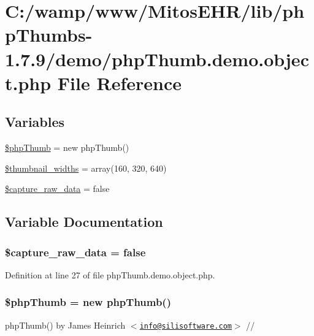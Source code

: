 \hypertarget{php_thumb_8demo_8object_8php}{\section{\-C\-:/wamp/www/\-Mitos\-E\-H\-R/lib/php\-Thumbs-\/1.7.9/demo/php\-Thumb.demo.\-object.\-php \-File \-Reference}
\label{php_thumb_8demo_8object_8php}
}
\subsection*{\-Variables}
\begin{DoxyCompactItemize}
\item 
\hyperlink{php_thumb_8demo_8object_8php_a1102b627fc78f79861c9271417c605c5}{\$php\-Thumb} = new php\-Thumb()
\item 
\hyperlink{php_thumb_8demo_8object_8php_a528541226e3cb081dcae8f65252eeb74}{\$thumbnail\-\_\-widths} = array(160, 320, 640)
\item 
\hyperlink{php_thumb_8demo_8object_8php_a0b5c74e16ddcf8750562f983ab6bce0a}{\$capture\-\_\-raw\-\_\-data} = false
\end{DoxyCompactItemize}


\subsection{\-Variable \-Documentation}
\hypertarget{php_thumb_8demo_8object_8php_a0b5c74e16ddcf8750562f983ab6bce0a}{
\subsubsection[{\$capture\-\_\-raw\-\_\-data}]{\setlength{\rightskip}{0pt plus 5cm}\$capture\-\_\-raw\-\_\-data = false}}\label{php_thumb_8demo_8object_8php_a0b5c74e16ddcf8750562f983ab6bce0a}


\-Definition at line 27 of file php\-Thumb.\-demo.\-object.\-php.

\hypertarget{php_thumb_8demo_8object_8php_a1102b627fc78f79861c9271417c605c5}{
\subsubsection[{\$php\-Thumb}]{\setlength{\rightskip}{0pt plus 5cm}\$php\-Thumb = new php\-Thumb()}}\label{php_thumb_8demo_8object_8php_a1102b627fc78f79861c9271417c605c5}
php\-Thumb() by \-James \-Heinrich $<$\href{mailto:info@silisoftware.com}{\tt info@silisoftware.\-com}$>$ // 

